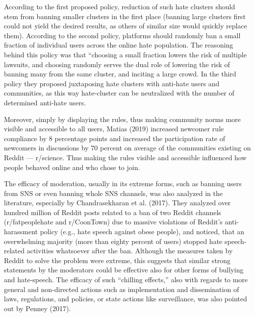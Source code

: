 \documentclass[10pt,dvipsnames]{scrartcl}
\begin{document}
According to the first proposed policy, reduction of such hate clusters
should stem from banning smaller clusters in the first place (banning
large clusters first could not yield the desired results, as others of
similar size would quickly replace them). According to the second
policy, platforms should randomly ban a small fraction of individual
users across the online hate population. The reasoning behind this
policy was that ``choosing a small fraction lowers the risk of multiple
lawsuits, and choosing randomly serves the dual role of lowering the
risk of banning many from the same cluster, and inciting a large crowd.
In the third policy they proposed juxtaposing hate clusters with
anti-hate users and communities, as this way hate-cluster can be
neutralized with the number of determined anti-hate users.

Moreover, simply by displaying the rules, thus making community norms
more visible and accessible to all users, Matias (2019) increased
newcomer rule compliance by 8 percentage points and increased the
participation rate of newcomers in discussions by 70 percent on average
of the communities existing on Reddit --- r/science. Thus making the
rules visible and accessible influenced how people behaved online and
who chose to join.

The efficacy of moderation, usually in its extreme forms, such as
banning users from SNS or even banning whole SNS channels, was also
analyzed in the literature, especially by Chandrasekharan et al. (2017).
They analyzed over hundred million of Reddit posts related to a ban of
two Reddit channels (r/fatpeoplehate and r/CoonTown) due to massive
violations of Reddit's anti-harassment policy (e.g., hate speech against
obese people), and noticed, that an overwhelming majority (more than
eighty percent of users) stopped hate speech-related activities
whatsoever after the ban. Although the measures taken by Reddit to solve
the problem were extreme, this suggests that similar strong statements
by the moderators could be effective also for other forms of bullying
and hate-speech. The efficacy of such ``chilling effects,'' also with
regards to more general and non-directed actions such as implementation
and dissemination of laws, regulations, and policies, or state actions
like surveillance, was also pointed out by Penney (2017).
\end{document}
